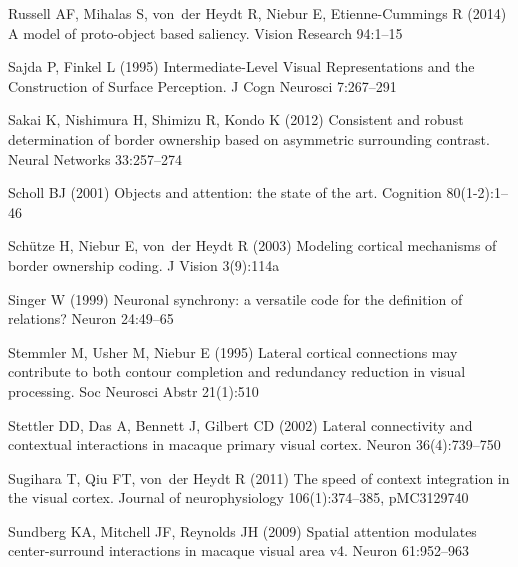 \begin{thebibliography}{90}
Russell AF, Mihalas S, von~der Heydt R, Niebur E, Etienne-Cummings R (2014) {A}
  model of proto-object based saliency. Vision Research 94:1--15

Sajda P, Finkel L (1995) {I}ntermediate-{L}evel {V}isual {R}epresentations and
  the {C}onstruction of {S}urface {P}erception. J Cogn Neurosci 7:267--291

Sakai K, Nishimura H, Shimizu R, Kondo K (2012) Consistent and robust
  determination of border ownership based on asymmetric surrounding contrast.
  Neural Networks 33:257--274

Scholl BJ (2001) {O}bjects and attention: the state of the art. Cognition
  80(1-2):1--46

Sch{\"u}tze H, Niebur E, von~der Heydt R (2003) {M}odeling cortical mechanisms
  of border ownership coding. J Vision 3(9):114a

Singer W (1999) {N}euronal synchrony: a versatile code for the definition of
  relations? Neuron 24:49--65

Stemmler M, Usher M, Niebur E (1995) {L}ateral cortical connections may
  contribute to both contour completion and redundancy reduction in visual
  processing. Soc Neurosci Abstr 21(1):510

Stettler DD, Das A, Bennett J, Gilbert CD (2002) {L}ateral connectivity and
  contextual interactions in macaque primary visual cortex. Neuron
  36(4):739--750

Sugihara T, Qiu FT, von~der Heydt R (2011) {T}he speed of context integration
  in the visual cortex. Journal of neurophysiology 106(1):374--385, pMC3129740

Sundberg KA, Mitchell JF, Reynolds JH (2009) {Spatial attention modulates
  center-surround interactions in macaque visual area v4}. Neuron 61:952--963


\end{thebibliography}
